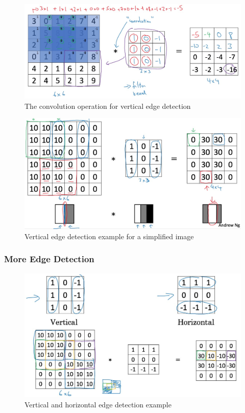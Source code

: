 \documentclass[UTF8]{article}
\begin{document}
\begin{figure}[htb]
    \centering
    \includegraphics[width=40em]{figures/convolution-operation}
    \caption{The convolution operation for vertical edge detection}
    \label{fig:convolution-operation}
\end{figure}

\begin{figure}[htb]
    \centering
    \includegraphics[width=40em]{figures/vertical-edge-detection-example}
    \caption{Vertical edge detection example for a simplified image}
    \label{fig:vertical-edge-detection-example}
\end{figure}

\subsubsection{More Edge Detection}
\begin{figure}[htb]
    \centering
    \includegraphics[width=40em]{figures/vertical-and-horizontal-edge-detection-example}
    \caption{Vertical and horizontal edge detection example}
    \label{fig:vertical-and-horizontal-edge-detection-example}
\end{figure}
\end{document}
